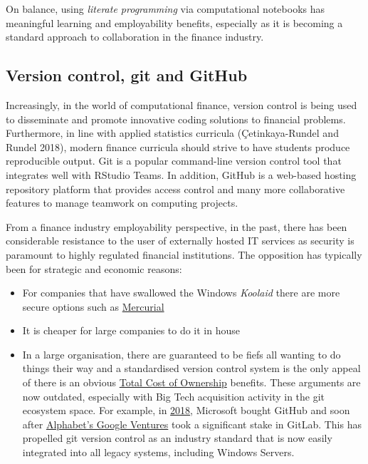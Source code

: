 \documentclass{article}
\begin{document}
On balance, using \emph{literate programming} via computational
notebooks has meaningful learning and employability benefits, especially
as it is becoming a standard approach to collaboration in the finance
industry.

\hypertarget{version-control-git-and-github}{%
\subsection{Version control, git and
GitHub}\label{version-control-git-and-github}}

Increasingly, in the world of computational finance, version control is
being used to disseminate and promote innovative coding solutions to
financial problems. Furthermore, in line with applied statistics
curricula (Çetinkaya-Rundel and Rundel 2018), modern finance curricula
should strive to have students produce reproducible output. Git is a
popular command-line version control tool that integrates well with
RStudio Teams. In addition, GitHub is a web-based hosting repository
platform that provides access control and many more collaborative
features to manage teamwork on computing projects.

From a finance industry employability perspective, in the past, there
has been considerable resistance to the user of externally hosted IT
services as security is paramount to highly regulated financial
institutions. The opposition has typically been for strategic and
economic reasons:

\begin{itemize}
\tightlist
\item
  For companies that have swallowed the Windows \emph{Koolaid} there are
  more secure options such as
  \href{https://www.mercurial-scm.org/}{Mercurial}
\item
  It is cheaper for large companies to do it in house
\item
  In a large organisation, there are guaranteed to be fiefs all wanting
  to do things their way and a standardised version control system is
  the only appeal of there is an obvious
  \href{https://www.investopedia.com/terms/t/totalcostofownership.asp}{Total
  Cost of Ownership} benefits. These arguments are now outdated,
  especially with Big Tech acquisition activity in the git ecosystem
  space. For example, in
  \href{https://www.bloomberg.com/news/articles/2018-06-03/microsoft-is-said-to-have-agreed-to-acquire-coding-site-github}{2018},
  Microsoft bought GitHub and soon after
  \href{https://www.bloomberg.com/news/articles/2018-09-19/alphabet-backs-gitlab-s-quest-to-surpass-microsoft-s-github}{Alphabet's
  Google Ventures} took a significant stake in GitLab. This has
  propelled git version control as an industry standard that is now
  easily integrated into all legacy systems, including Windows Servers.
\end{itemize}
\end{document}
